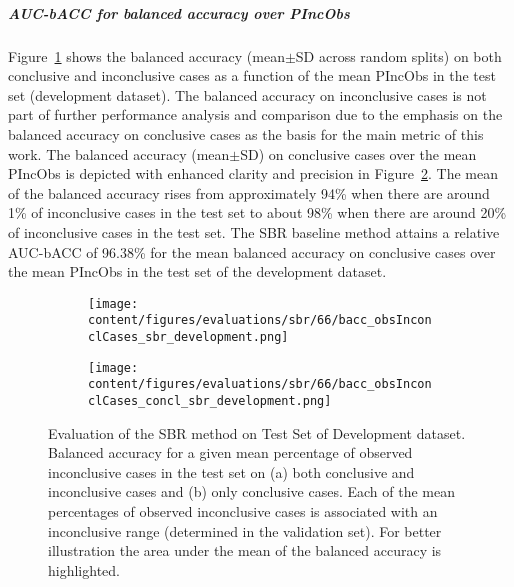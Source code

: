 \subparagraph{AUC-bACC for balanced accuracy over PIncObs}

Figure~\ref{fig:bacc_obsInconclCases_sbr_development} shows the balanced accuracy (mean$\pm$SD across random splits) 
on both conclusive and inconclusive cases as a function of the mean PIncObs
in the test set (development dataset).
The balanced accuracy on inconclusive cases is not part of further performance analysis and comparison 
due to the emphasis on the balanced accuracy on conclusive cases as the basis for the main metric of this work.
The balanced accuracy (mean$\pm$SD) on conclusive cases over the mean PIncObs
is depicted with enhanced clarity and precision in Figure~\ref{fig:bacc_obsInconclCases_concl_sbr_development}.
The mean of the balanced accuracy rises from approximately 94\% 
when there are around 1\% of inconclusive cases in the test set to about 98\% 
when there are around 20\% of inconclusive cases in the test set.
The SBR baseline method attains a relative AUC-bACC of 96.38\% for the mean balanced accuracy on conclusive cases
over the mean PIncObs in the test set of the development dataset.

\begin{figure}[ht]
    \begin{subfigure}{0.5\textwidth}
      \centering
      \texttt{[image: content/figures/evaluations/sbr/66/bacc\_obsInconclCases\_sbr\_development.png]}
      \subcaption{}
      \label{fig:bacc_obsInconclCases_sbr_development}
    \end{subfigure}
    \hfill
    \begin{subfigure}{0.5\textwidth}
      \centering
      \texttt{[image: content/figures/evaluations/sbr/66/bacc\_obsInconclCases\_concl\_sbr\_development.png]}
      \subcaption{}
      \label{fig:bacc_obsInconclCases_concl_sbr_development}
    \end{subfigure}

    \caption{Evaluation of the SBR method on Test Set of Development dataset.
    Balanced accuracy for a given mean percentage of observed inconclusive cases in the test set on 
    (a) both conclusive and inconclusive cases and (b) only conclusive cases. 
    Each of the mean percentages of observed inconclusive cases is associated with an inconclusive range (determined in the validation set).
    For better illustration the area under the mean of the balanced accuracy is highlighted.}
    \label{fig:bacc_obsInconclCases_sbr_development_full}
\end{figure}

